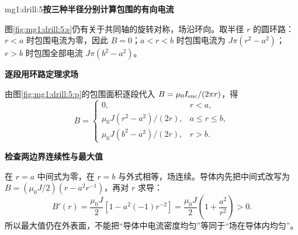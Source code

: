 \begin{drillsolution}{mg1:drill:5}\textbf{按三种半径分别计算包围的有向电流}\par\nobreak
图\ref{fig:mg1:drill:5:s}仍有关于共同轴的旋转对称，场沿环向。取半径 $r$ 的圆环路：$r<a$ 时包围电流为零，因此 $B=0$；$a<r<b$ 时包围电流为 $J\pi(r^2-a^2)$；$r>b$ 时包围全部电流 $J\pi(b^2-a^2)$。



\par\medskip{}\noindent\textbf{逐段用环路定理求场}\par\nobreak
由图\ref{fig:mg1:drill:5:p}的包围面积逐段代入 $B=\mu_0I_{\rm enc}/(2\pi r)$，得
\[
B=\begin{cases}0,&r<a,\\
\mu_0J(r^2-a^2)/(2r),&a\le r\le b,\\
\mu_0J(b^2-a^2)/(2r),&r>b.
\end{cases}
\]


\par\medskip{}\noindent\textbf{检查两边界连续性与最大值}\par\nobreak
在 $r=a$ 中间式为零，在 $r=b$ 与外式相等，场连续。导体内先把中间式改写为 $B=(\mu_0J/2)(r-a^2r^{-1})$，再对 $r$ 求导：
\[
 B'(r)=\frac{\mu_0J}{2}[1-a^2(-1)r^{-2}]
 =\frac{\mu_0J}{2}\left(1+\frac{a^2}{r^2}\right)>0.
\]
所以最大值仍在外表面，不能把“导体中电流密度均匀”等同于“场在导体内均匀”。\end{drillsolution}
